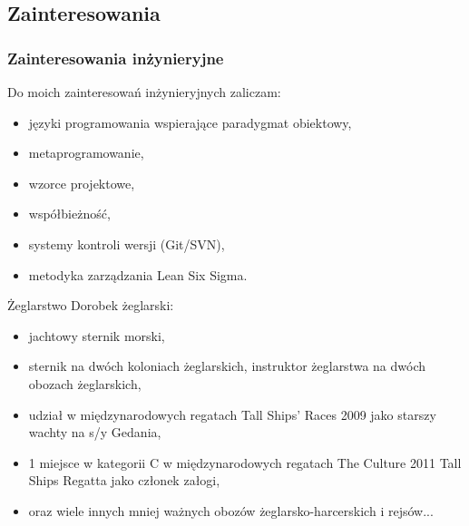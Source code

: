 \subsection{Zainteresowania}
\begin{frame}
  \frametitle{Zainteresowania inżynieryjne}
  
  Do moich zainteresowań inżynieryjnych zaliczam: \pause
  \begin{itemize}
  	\item języki programowania wspierające paradygmat obiektowy, \pause
  	\item metaprogramowanie,                                     \pause
  	\item wzorce projektowe,                                     \pause
  	\item współbieżność,                                         \pause
  	\item systemy kontroli wersji (Git/SVN),                     \pause
  	\item metodyka zarządzania Lean Six Sigma.
  \end{itemize}
\end{frame}

\begin{frame}{Żeglarstwo}
	Dorobek żeglarski:	
	\begin{itemize}
		\item jachtowy sternik morski,                                    \pause
		\item sternik na dwóch koloniach żeglarskich,
		  instruktor żeglarstwa na dwóch obozach żeglarskich,             \pause
		\item udział w międzynarodowych regatach Tall Ships' Races 2009
		  jako starszy wachty na s/y Gedania,                             \pause
		\item 1 miejsce w kategorii C w międzynarodowych regatach
		  The Culture 2011 Tall Ships Regatta jako członek załogi,        \pause
		\item oraz wiele innych mniej ważnych obozów żeglarsko-harcerskich i rejsów...          
	\end{itemize}
\end{frame}
	
